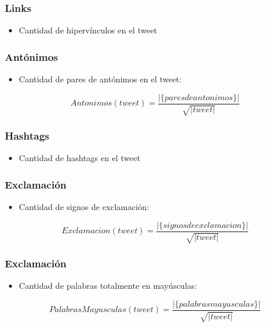 \begin{frame}
    \frametitle{Links}

    \begin{itemize}
        \item Cantidad de hipervínculos en el tweet
    \end{itemize}
\end{frame}

\begin{frame}
    \frametitle{Antónimos}

    \begin{itemize}
        \item Cantidad de pares de antónimos en el tweet:
    \end{itemize}

    \begin{center}
        \[
            Antonimos(tweet) = \frac{|\{pares de antonimos\}|}{\sqrt{|tweet|}}
        \]
    \end{center}
\end{frame}

\begin{frame}
    \frametitle{Hashtags}

    \begin{itemize}
        \item Cantidad de hashtags en el tweet
    \end{itemize}
\end{frame}

\begin{frame}
    \frametitle{Exclamación}

    \begin{itemize}
        \item Cantidad de signos de exclamación:
    \end{itemize}

    \begin{center}
        \[
            Exclamacion(tweet) = \frac{|\{signos de exclamacion\}|}{\sqrt{|tweet|}}
        \]
    \end{center}
\end{frame}

\begin{frame}
    \frametitle{Exclamación}

    \begin{itemize}
        \item Cantidad de palabras totalmente en mayúsculas:
    \end{itemize}

    \begin{center}
        \[
            PalabrasMayusculas(tweet) = \frac{|\{palabras mayusculas\}|}{\sqrt{|tweet|}}
        \]
    \end{center}
\end{frame}

